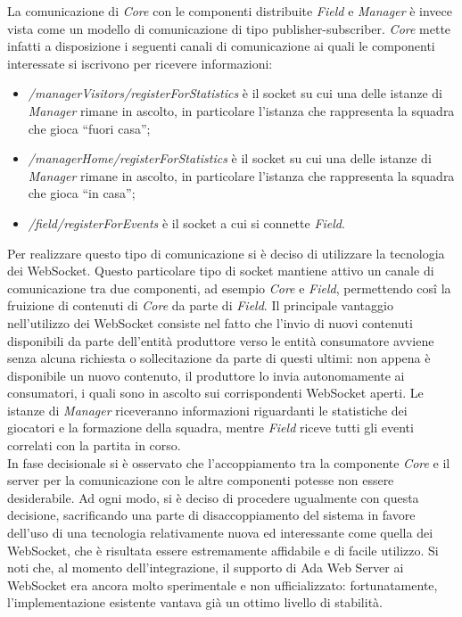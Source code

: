 La comunicazione di \emph{Core} con le componenti distribuite \emph{Field} e \emph{Manager} è invece vista come un modello di comunicazione di tipo publisher-subscriber. \emph{Core} mette infatti a disposizione i seguenti canali di comunicazione ai quali le componenti interessate si iscrivono per ricevere informazioni:

\begin{itemize}
	\item \emph{/managerVisitors/registerForStatistics} \`{e} il socket su cui una delle istanze di \emph{Manager} rimane in ascolto, in particolare l'istanza che rappresenta la squadra che gioca ``fuori casa'';
	\item \emph{/managerHome/registerForStatistics} \`{e} il socket su cui una delle istanze di \emph{Manager} rimane in ascolto, in particolare l'istanza che rappresenta la squadra che gioca ``in casa'';
	\item \emph{/field/registerForEvents} \`{e} il socket a cui si connette \emph{Field}.
\end{itemize}

Per realizzare questo tipo di comunicazione si è deciso di utilizzare la tecnologia dei WebSocket. Questo particolare tipo di socket mantiene attivo un canale di comunicazione tra due componenti, ad esempio \emph{Core} e \emph{Field}, permettendo cosî la fruizione di contenuti di \emph{Core} da parte di \emph{Field}. Il principale vantaggio nell'utilizzo dei WebSocket consiste nel fatto che l'invio di nuovi contenuti disponibili da parte dell'entità produttore verso le entità consumatore avviene senza alcuna richiesta o sollecitazione da parte di questi ultimi: non appena è disponibile un nuovo contenuto, il produttore lo invia autonomamente ai consumatori, i quali sono in ascolto sui corrispondenti WebSocket aperti. Le istanze di \emph{Manager} riceveranno informazioni riguardanti le statistiche dei giocatori e la formazione della squadra, mentre \emph{Field} riceve tutti gli eventi correlati con la partita in corso.\\

In fase decisionale si è osservato che l'accoppiamento tra la componente \emph{Core} e il server per la comunicazione con le altre componenti potesse non essere desiderabile. Ad ogni modo, si è deciso di procedere ugualmente con questa decisione, sacrificando una parte di disaccoppiamento del sistema in favore dell'uso di una tecnologia relativamente nuova ed interessante come quella dei WebSocket, che è risultata essere estremamente affidabile e di facile utilizzo. Si noti che, al momento dell'integrazione, il supporto di Ada Web Server ai WebSocket era ancora molto sperimentale e non ufficializzato: fortunatamente, l'implementazione esistente vantava già un ottimo livello di stabilità.\\

